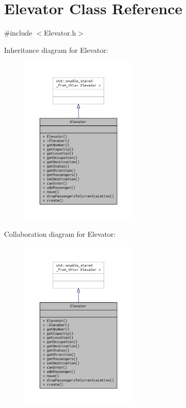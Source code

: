 \section{Elevator Class Reference}
\label{class_elevator}


{\ttfamily \#include $<$Elevator.\+h$>$}



Inheritance diagram for Elevator\+:\nopagebreak
\begin{figure}[H]
\begin{center}
\leavevmode
\includegraphics[width=160pt]{class_elevator__inherit__graph}
\end{center}
\end{figure}


Collaboration diagram for Elevator\+:\nopagebreak
\begin{figure}[H]
\begin{center}
\leavevmode
\includegraphics[width=160pt]{class_elevator__coll__graph}
\end{center}
\end{figure}
